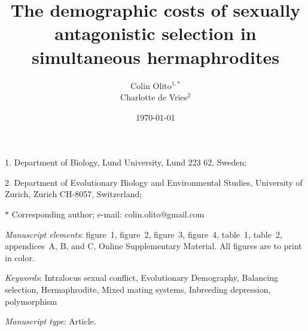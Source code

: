 \documentclass[11pt]{article}
\begin{document}
\title{The demographic costs of sexually antagonistic selection in simultaneous hermaphrodites}





\author{Colin Olito$^{1,\ast}$ \\ 
Charlotte de Vries$^{2}$}
\date{\today}
\maketitle

\noindent{} 1. Department of Biology, Lund University, Lund 223 62, Sweden;

\noindent{} 2.  Department of Evolutionary Biology and Environmental Studies, University of Zurich, Zurich CH-8057, Switzerland;

\noindent{} $\ast$ Corresponding author; e-mail: colin.olito@gmail.com

\bigskip

\textit{Manuscript elements}: figure~1, figure~2, figure~3, figure~4, table~1, table~2, appendices~A, B, and C, Online Supplementary Material. All figures are to print in color.

\bigskip

\textit{Keywords}: Intralocus sexual conflict, Evolutionary Demography, Balancing selection, Hermaphrodite, Mixed mating systems, Inbreeding depression, polymorphism 

\bigskip

\textit{Manuscript type}: Article. %

\bigskip

\end{document}
